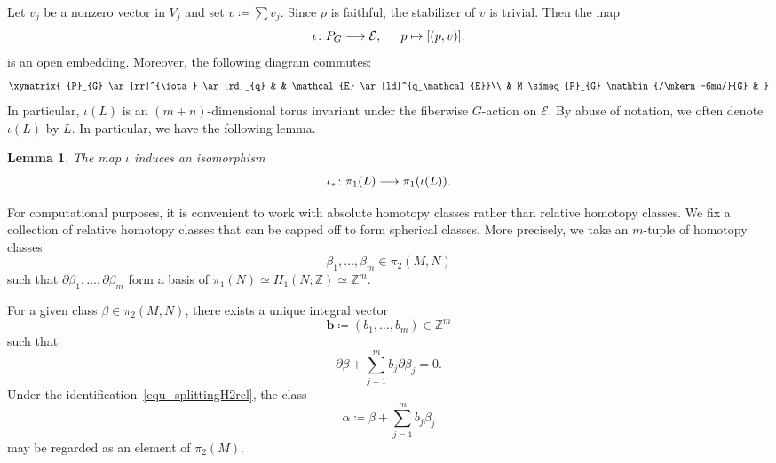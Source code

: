 \documentclass[11pt]{amsart}
\theoremstyle{plain}
\newtheorem{lemma}[theorem]{Lemma}
\theoremstyle{definition}
\theoremstyle{remark}
\newcommand{\Z}{\mathbb{Z}}
\newcommand{\git}{\mathbin{/\mkern-6mu/}}
\numberwithin{equation}{section} \numberwithin{table}{section}
\def\to{\mathchoice{\longrightarrow}{\rightarrow}{\rightarrow}{\rightarrow}}
\numberwithin{equation}{section}
\begin{document}
Let $v_j$ be a nonzero vector in $V_j$ and set $v \coloneqq \sum v_j$. Since $\rho$ is faithful, the stabilizer of $v$ is trivial. Then the map
$$
\iota \colon {P}_{G} \to \mathcal{E}, \,\quad \mbox{ $p \mapsto [(p, v)]$.}
$$
is an open embedding. 
Moreover, the following diagram commutes$\colon$ 
\begin{equation}
\xymatrix{
{P}_{G} \ar[rr]^{\iota} \ar[rd]_{q} & & \mathcal{E} \ar[ld]^{q_\mathcal{E}}\\
& M \simeq {P}_{G} \git {G} & 
}
\end{equation}
In particular, $\iota(L)$ is an $(m+n)$-dimensional torus invariant under the fiberwise $G$-action on $\mathcal{E}$. By abuse of notation, we often denote $\iota(L)$ by $L$. In particular, we have the following lemma.

\begin{lemma}\label{lemma_Lisomorphic}
The map $\iota$ induces an isomorphism
$$
\iota_* \colon \pi_1(L) \to \pi_1(\iota(L)).
$$ 
\end{lemma}

For computational purposes, it is convenient to work with absolute homotopy classes rather than relative homotopy classes. We fix a collection of relative homotopy classes that can be capped off to form spherical classes. More precisely, we take an $m$-tuple of homotopy classes
\begin{equation}\label{equ_mhomotopyboundary}
\beta_1, \dots, \beta_m \in \pi_2(M, N) 
\end{equation}
such that $\partial \beta_1, \dots, \partial \beta_m$ form a basis of $\pi_1(N) \simeq H_1(N; \Z) \simeq \Z^m$.

For a given class $\beta \in \pi_2(M,N)$, there exists a unique integral vector 
\begin{equation}\label{equ_mathbbb}
\mathbf{b} \coloneqq (b_1, \dots, b_m) \in \Z^m
\end{equation}
such that
\begin{equation}\label{equ_boundaryfree}
\partial \beta + \sum_{j=1}^m b_j \partial \beta_j = 0.
\end{equation}
Under the identification~\eqref{equ_splittingH2rel}, the class
\begin{equation}\label{equ_sphericalalpha}
\alpha \coloneqq \beta + \sum_{j=1}^m b_j \beta_j
\end{equation}
may be regarded as an element of $\pi_2(M)$.
\end{document}
